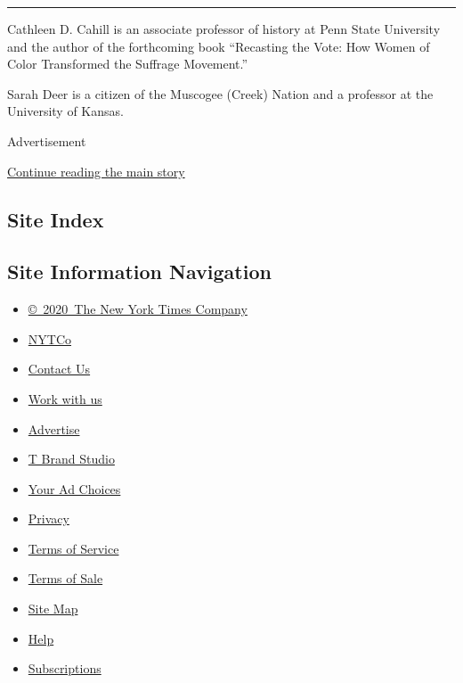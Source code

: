 \begin{center}\rule{0.5\linewidth}{\linethickness}\end{center}

Cathleen D. Cahill is an associate professor of history at Penn State
University and the author of the forthcoming book ``Recasting the Vote:
How Women of Color Transformed the Suffrage Movement.''

Sarah Deer is a citizen of the Muscogee (Creek) Nation and a professor
at the University of Kansas.

Advertisement

\protect\hyperlink{after-bottom}{Continue reading the main story}

\hypertarget{site-index}{%
\subsection{Site Index}\label{site-index}}

\hypertarget{site-information-navigation}{%
\subsection{Site Information
Navigation}\label{site-information-navigation}}

\begin{itemize}
\tightlist
\item
  \href{https://help.nytimes.com/hc/en-us/articles/115014792127-Copyright-notice}{©~2020~The
  New York Times Company}
\end{itemize}

\begin{itemize}
\tightlist
\item
  \href{https://www.nytco.com/}{NYTCo}
\item
  \href{https://help.nytimes.com/hc/en-us/articles/115015385887-Contact-Us}{Contact
  Us}
\item
  \href{https://www.nytco.com/careers/}{Work with us}
\item
  \href{https://nytmediakit.com/}{Advertise}
\item
  \href{http://www.tbrandstudio.com/}{T Brand Studio}
\item
  \href{https://www.nytimes.com/privacy/cookie-policy\#how-do-i-manage-trackers}{Your
  Ad Choices}
\item
  \href{https://www.nytimes.com/privacy}{Privacy}
\item
  \href{https://help.nytimes.com/hc/en-us/articles/115014893428-Terms-of-service}{Terms
  of Service}
\item
  \href{https://help.nytimes.com/hc/en-us/articles/115014893968-Terms-of-sale}{Terms
  of Sale}
\item
  \href{https://spiderbites.nytimes.com}{Site Map}
\item
  \href{https://help.nytimes.com/hc/en-us}{Help}
\item
  \href{https://www.nytimes.com/subscription?campaignId=37WXW}{Subscriptions}
\end{itemize}
